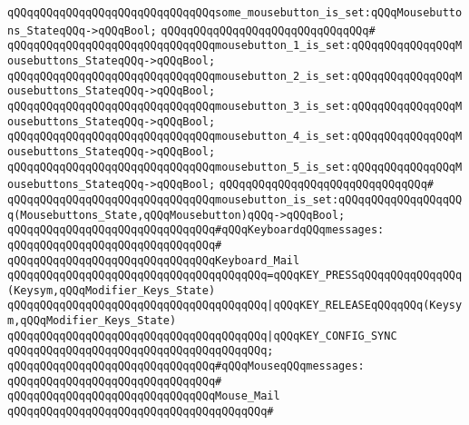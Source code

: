 \verb|qQQqqQQqqQQqqQQqqQQqqQQqqQQqqQQqsome_mousebutton_is_set:qQQqMousebuttons_StateqQQq->qQQqBool;|\newline
\verb|qQQqqQQqqQQqqQQqqQQqqQQqqQQqqQQq#|\newline
\verb|qQQqqQQqqQQqqQQqqQQqqQQqqQQqqQQqmousebutton_1_is_set:qQQqqQQqqQQqqQQqMousebuttons_StateqQQq->qQQqBool;|\newline
\verb|qQQqqQQqqQQqqQQqqQQqqQQqqQQqqQQqmousebutton_2_is_set:qQQqqQQqqQQqqQQqMousebuttons_StateqQQq->qQQqBool;|\newline
\verb|qQQqqQQqqQQqqQQqqQQqqQQqqQQqqQQqmousebutton_3_is_set:qQQqqQQqqQQqqQQqMousebuttons_StateqQQq->qQQqBool;|\newline
\verb|qQQqqQQqqQQqqQQqqQQqqQQqqQQqqQQqmousebutton_4_is_set:qQQqqQQqqQQqqQQqMousebuttons_StateqQQq->qQQqBool;|\newline
\verb|qQQqqQQqqQQqqQQqqQQqqQQqqQQqqQQqmousebutton_5_is_set:qQQqqQQqqQQqqQQqMousebuttons_StateqQQq->qQQqBool;|\newline
\verb|qQQqqQQqqQQqqQQqqQQqqQQqqQQqqQQq#|\newline
\verb|qQQqqQQqqQQqqQQqqQQqqQQqqQQqqQQqmousebutton_is_set:qQQqqQQqqQQqqQQqqQQq(Mousebuttons_State,qQQqMousebutton)qQQq->qQQqBool;|\newline
\newline
\newline
\verb|qQQqqQQqqQQqqQQqqQQqqQQqqQQqqQQq#qQQqKeyboardqQQqmessages:|\newline
\verb|qQQqqQQqqQQqqQQqqQQqqQQqqQQqqQQq#|\newline
\verb|qQQqqQQqqQQqqQQqqQQqqQQqqQQqqQQqKeyboard_Mail|\newline
\verb|qQQqqQQqqQQqqQQqqQQqqQQqqQQqqQQqqQQqqQQq=qQQqKEY_PRESSqQQqqQQqqQQqqQQq(Keysym,qQQqModifier_Keys_State)|\newline
\verb|qQQqqQQqqQQqqQQqqQQqqQQqqQQqqQQqqQQqqQQq|\verb#|qQQqKEY_RELEASEqQQqqQQq(Keysym,qQQqModifier_Keys_State)#\newline
\verb|qQQqqQQqqQQqqQQqqQQqqQQqqQQqqQQqqQQqqQQq|\verb#|qQQqKEY_CONFIG_SYNC#\newline
\verb|qQQqqQQqqQQqqQQqqQQqqQQqqQQqqQQqqQQqqQQq;|\newline
\newline
\verb|qQQqqQQqqQQqqQQqqQQqqQQqqQQqqQQq#qQQqMouseqQQqmessages:|\newline
\verb|qQQqqQQqqQQqqQQqqQQqqQQqqQQqqQQq#|\newline
\verb|qQQqqQQqqQQqqQQqqQQqqQQqqQQqqQQqMouse_Mail|\newline
\verb|qQQqqQQqqQQqqQQqqQQqqQQqqQQqqQQqqQQqqQQq#|\newline
